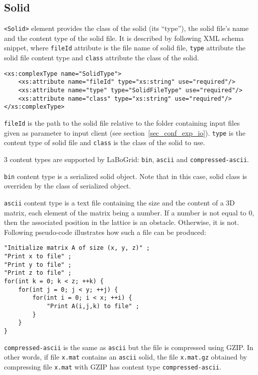 \subsection{Solid}
\label{sec_conf_lbConf_sol}

\verb|<Solid>| element provides the class of the solid (its ``type''),
the solid file's name and the content type of the solid file. It is described
by following XML schema snippet, where \texttt{fileId} attribute is the file
name of solid file, \texttt{type} attribute the solid file content type and
\texttt{class} attribute the class of the solid.

\begin{Verbatim}[tabsize=2,frame=lines]
<xs:complexType name="SolidType">
	<xs:attribute name="fileId" type="xs:string" use="required"/>
	<xs:attribute name="type" type="SolidFileType" use="required"/>
	<xs:attribute name="class" type="xs:string" use="required"/>
</xs:complexType>
\end{Verbatim}

\texttt{fileId} is the path to the solid file relative to the folder containing
input files given as parameter to input client (see
section~\ref{sec_conf_exp_io}). \texttt{type} is the content type of solid file
and \texttt{class} is the class of the solid to use.

3 content types are supported by LaBoGrid: \texttt{bin}, \texttt{ascii} and
\texttt{compressed-ascii}.

\texttt{bin} content type is a serialized solid
object. Note that in this case, solid class is overriden by the class of
serialized object.

\texttt{ascii} content type is a text file containing the
size and the content of a 3D matrix, each element of the matrix being a number.
If a number is not equal to 0, then the associated position in the lattice is
an obstacle. Otherwise, it is not. Following pseudo-code illustrates how such a
file can be produced:

\begin{Verbatim}[tabsize=2,frame=lines]
"Initialize matrix A of size (x, y, z)" ;
"Print x to file" ;
"Print y to file" ;
"Print z to file" ;
for(int k = 0; k < z; ++k) {
	for(int j = 0; j < y; ++j) {
		for(int i = 0; i < x; ++i) {
			"Print A(i,j,k) to file" ;
		}
	}
}
\end{Verbatim}

\texttt{compressed-ascii} is the same as \texttt{ascii} but the file is
compressed using GZIP. In other words, if file \texttt{x.mat} contains an
\texttt{ascii} solid, the file \texttt{x.mat.gz} obtained by compressing file
\texttt{x.mat} with GZIP has content type \texttt{compressed-ascii}.

